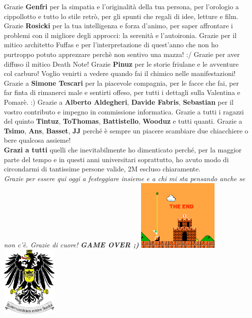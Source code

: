 \documentclass[10pt]{amsart}
\newcommand{\n}[1]{{\Large \bf #1}}
\begin{document}
Grazie \n{Genfri} per la simpatia e l'originalità della tua persona, per l'orologio a cippollotto e tutto lo stile retrò, per gli spunti che regali di idee, letture e film. Grazie \n{Rosicki} per la tua intelligenza e forza d'animo, per saper affrontare i problemi con il migliore degli approcci: la serenità e l'autoironia. Grazie per il mitico architetto Fuffas e per l'interpretazione di quest'anno che non ho purtroppo potuto apprezzare perchè non sentivo una mazza! :/  Grazie per aver diffuso il mitico Death Note! Grazie \n{Pinuz} per le storie friulane e le avventure col carburo! Voglio venirti a vedere quando fai il chimico nelle manifestazioni! Grazie a \n{Simone Tescari} per la piacevole compagnia, per le facce che fai, per far finta di rimanerci male e sentirti offeso, per tutti i dettagli sulla Valentina e Pomarè. :) Grazie a \n{Alberto Aldegheri}, \n{Davide Fabris}, \n{Sebastian} per il vostro contributo e impegno in commissione informatica. Grazie a tutti i ragazzi del quinto \n{Tintuz}, \n{ToThomas}, \n{Battistello}, \n{Wooduz} e tutti quanti. Grazie a \n{Tsimo}, \n{Ans}, \n{Basset}, \n{JJ} perché è sempre un piacere scambiare due chiacchiere o bere qualcosa assieme!\\

\n{Grazi a tutti} quelli che inevitabilmente ho dimenticato perché, per la maggior parte del tempo e in questi anni universitari soprattutto, ho avuto modo di circondarmi di tantissime persone valide, 2M escluso chiaramente.\\

\noindent\emph{Grazie per essere qui oggi a festeggiare insieme e a chi mi sta pensando anche se non c'è. Grazie di cuore! \n{GAME OVER ;)}} 
\center
\vspace{0.2cm}
\includegraphics[width=4cm]{immagini/gameover} \hspace{2cm }\includegraphics[height=3.5cm]{immagini/logoprimo}
\end{document}
